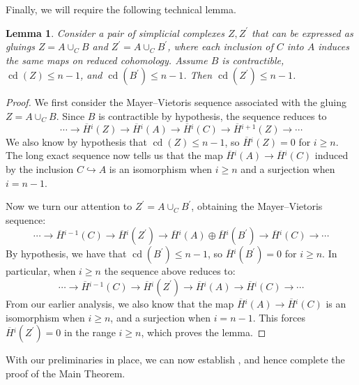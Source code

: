\documentclass[12pt, letterpaper]{article}
\newcommand{\cdim}{\operatorname{cd}}
\theoremstyle{plain}
\newtheorem{lem}[thm]{Lemma}
\theoremstyle{definition}
\begin{document}
Finally, we will require the following technical lemma.

\begin{lem}\label{lem:cdim-of-gluings}
    Consider a pair of simplicial complexes $Z, Z^\prime$ that can be expressed as gluings $Z = A \cup_C B$ and $Z^\prime = A \cup _C B^\prime$, where each inclusion of $C$ into $A$ induces the same maps on reduced cohomology. Assume $B$ is contractible, $\cdim(Z)\leq n-1$, and $\cdim(B^\prime)\leq n-1$. Then $\cdim (Z^\prime) \leq n-1$.
\end{lem}

\begin{proof}
We first consider the Mayer--Vietoris sequence associated with the gluing $Z=A\cup_C B$. Since $B$ is contractible by hypothesis, the sequence reduces to
    \[ \cdots \longrightarrow \overline{H}{}^i(Z) \longrightarrow \overline{H}{}^i(A) \longrightarrow \overline{H}{}^i(C)\longrightarrow \overline{H}{}^{i+1}(Z) \longrightarrow \cdots \]
We also know by hypothesis that $\cdim(Z)\leq n-1$, so $\overline{H}{}^i(Z)=0$ for $i\geq n$. The long exact sequence now tells us that the map $\overline{H}{}^i(A) \rightarrow \overline{H}{}^i(C)$ induced by the inclusion $C\hookrightarrow A$ is an isomorphism when $i\geq n$ and a surjection when $i=n-1$.

Now we turn our attention to $Z^\prime= A\cup_C B^\prime$, obtaining the Mayer--Vietoris sequence:
    \[ \cdots \longrightarrow \overline{H}{}^{i-1}(C) \longrightarrow \overline{H}{}^i(Z^\prime) \longrightarrow \overline{H}{}^i(A)\oplus \overline{H}{}^i(B^\prime) \longrightarrow \overline{H}{}^i(C)\longrightarrow \cdots \]
By hypothesis, we have that $\cdim(B^\prime) \leq n-1$, so $\overline{H}{}^i(B^\prime)=0$ for $i\geq n$. In particular, when $i\geq n$ the sequence above reduces to:
    \[ \cdots \longrightarrow \overline{H}{}^{i-1}(C) \longrightarrow \overline{H}{}^i(Z^\prime) \longrightarrow \overline{H}{}^i(A) \longrightarrow \overline{H}{}^i(C)\longrightarrow \cdots \]
From our earlier analysis, we also know that the map $\overline{H}{}^i(A) \rightarrow \overline{H}{}^i(C)$ is an isomorphism when $i\geq n$, and a surjection when $i=n-1$. This forces $\overline{H}{}^i(Z^\prime)=0$ in the range $i\geq n$, which proves the lemma.
\end{proof}

With our preliminaries in place, we can now establish , and hence complete the proof of the Main Theorem.
\end{document}
